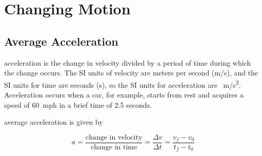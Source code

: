 \documentclass[dvipsnames]{article}
\begin{document}
\section{Changing Motion}

\subsection{Average Acceleration}


acceleration is the change in velocity divided by a period of time during which the change occurs. The SI units of velocity are meters per second (m/s), and the SI units for time are seconds (s), so the SI units for acceleration are \SI{}{m/s^2}. Acceleration occurs when a car, for example, starts from rest and acquires a speed of \SI{60}{mph} in a brief time of 2.5 seconds. 

\begin{center}
\end{center}

\vspace{1em}

average acceleration is given by

\begin{equation} \label{33EGTg}
    a = \frac{\text{change in velocity}}{\text{change in time}} = \frac{\Delta{v}}{\Delta{t}} = \frac{v_f - v_0}{t_f - t_0}
\end{equation}
\end{document}
